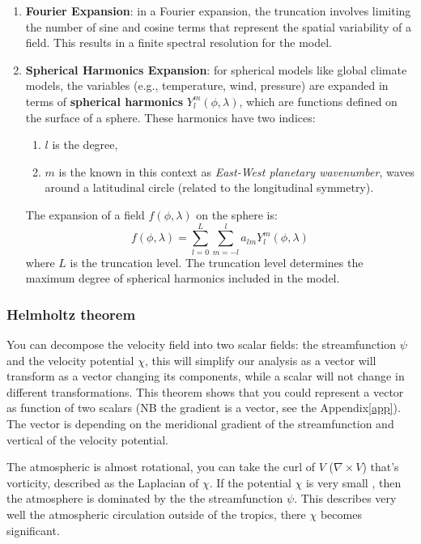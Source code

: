 \begin{enumerate}
	\item \textbf{Fourier Expansion}: in a Fourier expansion, the truncation involves limiting the number of sine and cosine terms that represent the spatial variability of a field. This results in a finite spectral resolution for the model.
	\item \textbf{Spherical Harmonics Expansion}: for spherical models like global climate models, the variables (e.g., temperature, wind, pressure) are expanded in terms of \textbf{spherical harmonics} $Y_l^m(\phi,\lambda)$, which are functions defined on the surface of a sphere. These harmonics have two indices:
	      \begin{enumerate}
		      \item  $l$ is the degree,
		      \item $m$ is the known in this context as \textit{East-West planetary wavenumber}, waves around a latitudinal circle (related to the longitudinal symmetry).
	      \end{enumerate}
	      The expansion of a field $f(\phi, \lambda)$ on the sphere is: $$f(\phi, \lambda)=\displaystyle\sum_{l=0}^L\displaystyle\sum_{m=-l}^la_{lm}Y_l^m(\phi,\lambda)$$
	      where $L$ is the truncation level. The truncation level determines the maximum degree of spherical harmonics included in the model.
\end{enumerate}

\subsubsection{Helmholtz theorem}
You can decompose the velocity field into two scalar fields: the streamfunction $\psi$ and the velocity potential $\chi$, this will simplify our analysis as a  vector will transform as a vector changing its components, while a scalar will not change in different transformations. This theorem shows that you could represent a vector as function of two scalars (NB the gradient is a vector, see the Appendix\ref{app}). The vector is depending on the meridional gradient of the streamfunction and vertical of the velocity potential.


The atmospheric is almost rotational, you can take the curl of $V$ ($\nabla \times V$) that's vorticity, described as the Laplacian of $\chi$. If the potential $\chi$ is very small , then the atmosphere is dominated by the the streamfunction $\psi$. This describes very well the atmospheric circulation outside of the tropics, there $\chi$ becomes significant.
